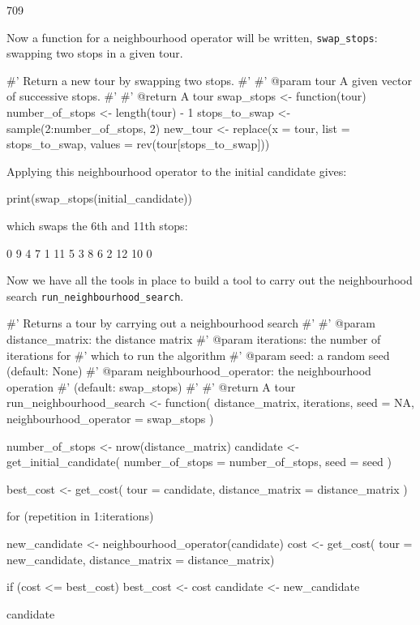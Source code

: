 \begin{Rout}
[1] 709
\end{Rout}

Now a function for a neighbourhood operator will be written,
\texttt{swap_stops}: swapping two stops in a given tour.

\begin{Rin}
#' Return a new tour by swapping two stops.
#'
#' @param tour A given vector of successive stops.
#'
#' @return A tour
swap_stops <- function(tour){
    number_of_stops <- length(tour) - 1
    stops_to_swap <- sample(2:number_of_stops, 2)
    new_tour <- replace(x = tour,
                        list = stops_to_swap,
                        values = rev(tour[stops_to_swap]))
    }
\end{Rin}

Applying this neighbourhood operator to the initial candidate gives:

\begin{Rin}
print(swap_stops(initial_candidate))
\end{Rin}

which swaps the 6th and 11th stops:

\begin{Rout}
 [1]  0  9  4  7  1 11  5  3  8  6  2 12 10  0
\end{Rout}

Now we have all the tools in place to build a tool to carry out the
neighbourhood search \texttt{run_neighbourhood_search}.

\begin{Rin}
#' Returns a tour by carrying out a neighbourhood search
#'
#' @param distance_matrix: the distance matrix
#' @param iterations: the number of iterations for
#'                    which to run the algorithm
#' @param seed: a random seed (default: None)
#' @param neighbourhood_operator: the neighbourhood operation
#'                                (default: swap_stops)
#'
#' @return A tour
run_neighbourhood_search <- function(
  distance_matrix,
  iterations,
  seed = NA,
  neighbourhood_operator = swap_stops
){
  number_of_stops <- nrow(distance_matrix)
  candidate <- get_initial_candidate(
    number_of_stops = number_of_stops,
    seed = seed
    )

  best_cost <- get_cost(
    tour = candidate,
    distance_matrix = distance_matrix
    )

  for (repetition in 1:iterations) {
    new_candidate <- neighbourhood_operator(candidate)
    cost <- get_cost(
        tour = new_candidate,
        distance_matrix = distance_matrix)

    if (cost <= best_cost) {
      best_cost <- cost
      candidate <- new_candidate
    }

  }
  candidate
}
\end{Rin}

